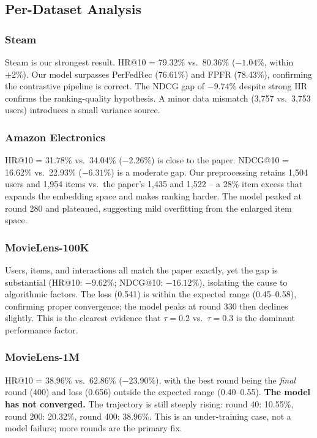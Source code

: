 \documentclass[10pt,twocolumn]{article}
\begin{document}
\subsection{Per-Dataset Analysis}

\subsubsection{Steam}
Steam is our strongest result. HR@10 = 79.32\% vs.\ 80.36\% ($-1.04\%$,
within $\pm2\%$). Our model surpasses PerFedRec (76.61\%) and FPFR
(78.43\%), confirming the contrastive pipeline is correct. The NDCG gap
of $-9.74\%$ despite strong HR confirms the ranking-quality hypothesis.
A minor data mismatch (3,757 vs.\ 3,753 users) introduces a small
variance source.

\subsubsection{Amazon Electronics}
HR@10 = 31.78\% vs.\ 34.04\% ($-2.26\%$) is close to the paper.
NDCG@10 = 16.62\% vs.\ 22.93\% ($-6.31\%$) is a moderate gap. Our
preprocessing retains 1,504 users and 1,954 items vs.\ the paper's
1,435 and 1,522 -- a 28\% item excess that expands the embedding space
and makes ranking harder. The model peaked at round 280 and plateaued,
suggesting mild overfitting from the enlarged item space.

\subsubsection{MovieLens-100K}
Users, items, and interactions all match the paper exactly, yet the gap
is substantial (HR@10: $-9.62\%$; NDCG@10: $-16.12\%$), isolating the
cause to algorithmic factors. The loss (0.541) is within the expected
range (0.45--0.58), confirming proper convergence; the model peaks at
round 330 then declines slightly. This is the clearest evidence that
$\tau{=}0.2$ vs.\ $\tau{=}0.3$ is the dominant performance factor.

\subsubsection{MovieLens-1M}
HR@10 = 38.96\% vs.\ 62.86\% ($-23.90\%$), with the best round being
the \emph{final} round (400) and loss (0.656) outside the expected range
(0.40--0.55). \textbf{The model has not converged.} The trajectory is
still steeply rising: round 40: 10.55\%, round 200: 20.32\%, round 400:
38.96\%. This is an under-training case, not a model failure; more
rounds are the primary fix.
\end{document}
